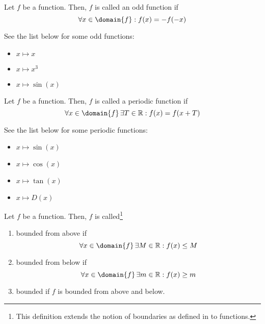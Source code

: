 \begin{definition}\label{def-odd-function}
    Let $f$ be a function. Then, $f$ is called an odd function if
    \begin{equation}
        \forall x\in\domain{f}:f(x)=-f(-x)
    \end{equation}
\end{definition}

\begin{exm}
    See the list below for some odd functions:
    \begin{itemize}
        \item $x\mapsto x$
        \item $x\mapsto x^3$
        \item $x\mapsto\sin(x)$
    \end{itemize}
\end{exm}

\begin{definition}
    Let $f$ be a function. Then, $f$ is called a periodic function if
    \begin{equation}
        \forall x\in\domain{f}\,\exists T\in\mathbb{R}: f(x)=f(x+T)
    \end{equation}
\end{definition}

\begin{exm}
    See the list below for some periodic functions:
    \begin{itemize}
        \item $x\mapsto\sin(x)$
        \item $x\mapsto\cos(x)$
        \item $x\mapsto\tan(x)$
        \item \hyperref[def-dirichlet-function]{$x\mapsto D(x)$}
    \end{itemize}
\end{exm}

\begin{definition}\label{def-bounded-function}
    Let $f$ be a function. Then, $f$ is called\footnote{This definition extends 
    the notion of boundaries as defined in  to 
    functions.}
    \begin{enumerate}
        \item bounded from above if
        \begin{equation}
            \forall x\in\domain{f}\,\exists M\in\mathbb{R}:f(x)\leq M
        \end{equation}
        \item bounded from below if 
        \begin{equation}
            \forall x\in\domain{f}\,\exists m\in\mathbb{R}:f(x)\geq m
        \end{equation}
        \item bounded if $f$ is bounded from above and below.
    \end{enumerate}
\end{definition}

